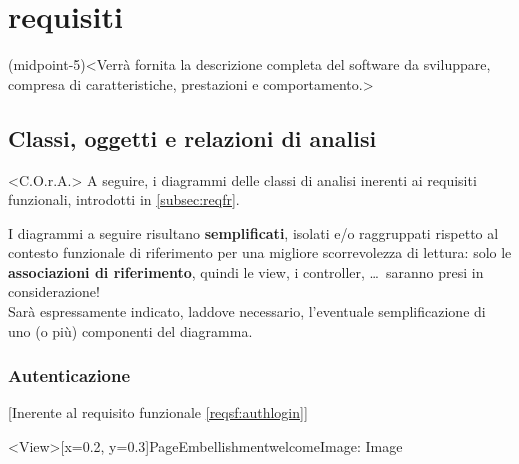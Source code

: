 

\chapter[Specifica dei]{requisiti}(midpoint-5)<Verrà fornita la descrizione completa del software da sviluppare, compresa di caratteristiche, prestazioni e comportamento.>

\section{Classi, oggetti e relazioni di analisi}<C.O.r.A.>
A seguire, i diagrammi delle classi di analisi inerenti ai requisiti funzionali, introdotti in \ref{subsec:reqfr}.

\begin{warn}[Semplificazione]
	I diagrammi a seguire risultano \textbf{semplificati}, isolati e/o raggruppati
	rispetto al contesto funzionale di riferimento per
	una migliore scorrevolezza di lettura: solo le \textbf{associazioni di riferimento}, quindi 
	le view, i controller, \dots\ saranno presi in considerazione!\\[0.5cm]
	Sarà espressamente indicato, laddove necessario, l'eventuale semplificazione
	di uno (o più) componenti del diagramma.\\[0.5cm]
\end{warn}

\begingroup
		{\xdef\reqfrcolorauthlogin{purple!70!yellow}}
	\hypersetup{allcolors=\reqfrcolorauthlogin}
	\subsection{Autenticazione}[Inerente al requisito funzionale \ref{reqsf:authlogin}]
	\begin{ddclassdiagram}[0.75]
		[x=0.2, y=0.3]{PageEmbellishment}{welcomeImage: Image}




	\end{ddclassdiagram}

